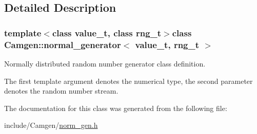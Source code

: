 \subsection{Detailed Description}
\subsubsection*{template$<$class value\+\_\+t, class rng\+\_\+t$>$class Camgen\+::normal\+\_\+generator$<$ value\+\_\+t, rng\+\_\+t $>$}

Normally distributed random number generator class definition. 

The first template argument denotes the numerical type, the second parameter denotes the random number stream. 

The documentation for this class was generated from the following file\+:\begin{DoxyCompactItemize}
\item 
include/\+Camgen/\hyperlink{a00701}{norm\+\_\+gen.\+h}\end{DoxyCompactItemize}
